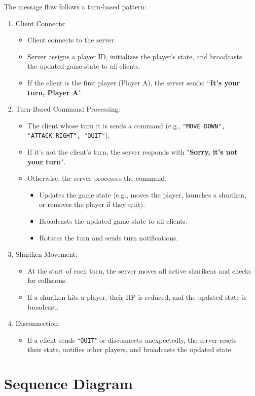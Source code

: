 \documentclass{article}
\begin{document}
\begin{enumerate}
    The message flow follows a turn-based pattern:
    \begin{enumerate}
        \item Client Connects:
            \begin{itemize}
                \item Client connects to the server.
                \item Server assigns a player ID, initializes the player's state, and broadcasts the updated game state to all clients.
                \item If the client is the first player (Player A), the server sends: ``\textbf{It's your turn, Player A}".
            \end{itemize}
        \item Turn-Based Command Processing:
            \begin{itemize}
                \item The client whose turn it is sends a command (e.g., \texttt{"MOVE DOWN", "ATTACK RIGHT", "QUIT"}).
                \item If it's not the client's turn, the server responds with "\textbf{Sorry, it's not your turn}".
                \item Otherwise, the server processes the command:
                    \begin{itemize}
                        \item Updates the game state (e.g., moves the player, launches a shuriken, or removes the player if they quit).
                        \item Broadcasts the updated game state to all clients.
                        \item Rotates the turn and sends turn notifications.
                    \end{itemize}
            \end{itemize}
        \item Shuriken Movement:
            \begin{itemize}
                \item At the start of each turn, the server moves all active shurikens and checks for collisions.
                \item If a shuriken hits a player, their HP is reduced, and the updated state is broadcast.
            \end{itemize}
        \item Disconnection:
            \begin{itemize}
                \item If a client sends ``\texttt{QUIT}" or disconnects unexpectedly, the server resets their state, notifies other players, and broadcasts the updated state.
            \end{itemize}
    \end{enumerate}
\end{enumerate}

\section*{Sequence Diagram}
\end{document}
